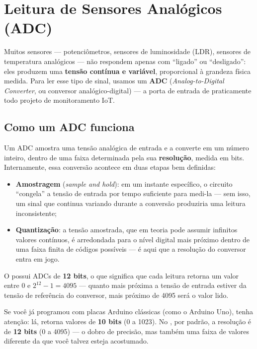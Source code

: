 \chapter{Leitura de Sensores Analógicos (ADC)}
\label{cap:adc}

Muitos sensores — potenciômetros, sensores de luminosidade (LDR), sensores de temperatura analógicos — não respondem apenas com ``ligado'' ou ``desligado'': eles produzem uma \textbf{tensão contínua e variável}, proporcional à grandeza física medida. Para ler esse tipo de sinal, usamos um \textbf{ADC} (\emph{Analog-to-Digital Converter}, ou conversor analógico-digital) — a porta de entrada de praticamente todo projeto de monitoramento IoT.

\section{Como um ADC funciona}

Um ADC amostra uma tensão analógica de entrada e a converte em um número inteiro, dentro de uma faixa determinada pela sua \textbf{resolução}, medida em bits. Internamente, essa conversão acontece em duas etapas bem definidas:

\begin{itemize}
    \item \textbf{Amostragem} (\emph{sample and hold}): em um instante específico, o circuito ``congela'' a tensão de entrada por tempo suficiente para medi-la — sem isso, um sinal que continua variando durante a conversão produziria uma leitura inconsistente;
    \item \textbf{Quantização}: a tensão amostrada, que em teoria pode assumir infinitos valores contínuos, é arredondada para o nível digital mais próximo dentro de uma faixa finita de códigos possíveis — é aqui que a resolução do conversor entra em jogo.
\end{itemize}

O \ESP{} possui ADCs de \textbf{12 bits}, o que significa que cada leitura retorna um valor entre 0 e $2^{12}-1 = 4095$ — quanto mais próxima a tensão de entrada estiver da tensão de referência do conversor, mais próximo de 4095 será o valor lido.

\begin{atencao}
Se você já programou com placas Arduino clássicas (como o Arduino Uno), tenha atenção: lá,  retorna valores de \textbf{10 bits} (0 a 1023). No \ESP{}, por padrão, a resolução é de \textbf{12 bits} (0 a 4095) — o dobro de precisão, mas também uma faixa de valores diferente da que você talvez esteja acostumado.
\end{atencao}

